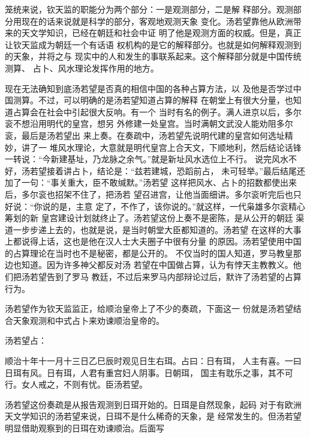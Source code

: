 \par
笼统来说，钦天监的职能分为两个部分：一是观测部分，二是解%
释部分。观测部分用现在的话来说就是科学的部分，客观地观测天象%
变化。汤若望靠他从欧洲带来的天文学知识，已经在朝廷和社会中证%
明了他是观测方面的权威。但是，真正让钦天监成为朝廷一个有话语%
权机构的是它的解释部分。也就是如何解释观测到的天象，并将之与%
现实中的人和发生的事联系起来。这个解释部分就是中国传统测算、%
占卜、风水理论发挥作用的地方。%
\par
现在无法确知到底汤若望是否真的相信中国的各种占算方法，以%
及他是否学过中国测算。不过，可以明确的是汤若望知道占算的解释%
在朝堂上有很大分量，也知道占算会在社会中引起很大反响。有一个%
当时有名的例子。满人进京以后，多尔衮不想沿用明代的皇宫，想另%
外修建一处皇宫。当时满朝文武没人能劝阻多尔衮，最后是汤若望出%
来上奏。在奏疏中，汤若望先说明代建的皇宫如何选址精妙，讲了一%
堆风水理论，大意就是明代皇宫上合天文，下顺地利，然后结论话锋%
一转说：“今新建基址，乃龙脉之余气。”就是新址风水选位上不行。%
说完风水不好，汤若望接着讲占卜，结论是：“兹若建城，恐蹈前占，%
未可轻举。”最后结尾还加了一句：“事关重大，臣不敢缄默。”汤若望%
这样把风水、占卜的招数都使出来后，多尔衮也招架不住了，把汤若%
望召进宫，让他当面细讲。多尔衮听完后也只好说：“你说的是，主意%
定了，不作了，该你说的。”就这样，一代枭雄多尔衮精心筹划的新%
皇宫建设计划就终止了。汤若望这份上奏不是密陈，是从公开的朝廷%
渠道一步步递上去的，也就是说，是当时朝堂大臣都知道的。汤若望%
在这样的大事上都说得上话，这也是他在汉人士大夫圈子中很有分量%
的原因。汤若望使用中国的占算理论在当时也不是秘密，都是公开的。%
不仅当时的国人知道，罗马教皇那边也知道。因为许多神父都反对汤%
若望在中国做占算，认为有悖天主教教义。他们把汤若望告到了罗马%
教廷，不过后来罗马内部辩论过后，默许了汤若望的占算行为。%
\par
汤若望作为钦天监监正，给顺治皇帝上了不少的奏疏，下面这一%
份就是汤若望结合天象观测和中式占卜来劝谏顺治皇帝的。%
\par
汤若望占：%
\par
{\bookkai 顺治十年十一月十三日乙巳辰时观见日生右珥。占曰：日有珥，}%
{\bookkai 人主有喜。一曰日珥有风。日有珥，人君有重宫妇人阴事。日朝珥，}%
{\bookkai 国主有耽乐之事，其不可行。女人戒之，不则有忧。臣汤若望。}%
\par
汤若望这份奏疏是从报告观测到日珥开始的。日珥是自然现象，起码%
对于有欧洲天文学知识的汤若望来说，日珥不是什么稀奇的天象，是%
经常发生的。但汤若望明显借助观察到的日珥在劝谏顺治。后面写%
